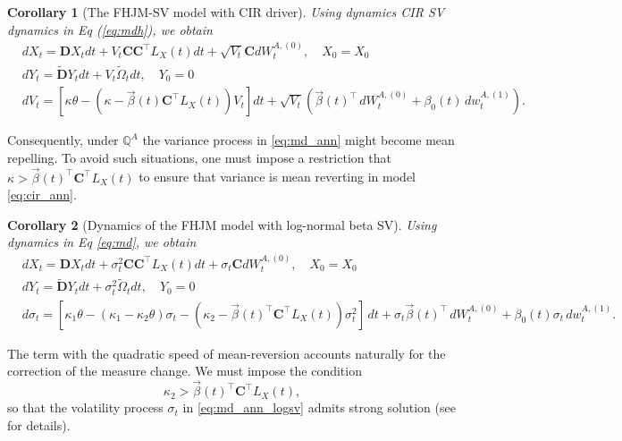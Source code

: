 \documentclass[pdftex,11pt,a4paper] {article}
\newtheorem{corollary}{Corollary}[section]
\begin{document}
\begin{corollary}[The FHJM-SV model with CIR driver] Using dynamics CIR SV dynamics in Eq (\ref{eq:mdh}), we obtain
\begin{equation}\label{eq:cir_ann}
\begin{split}
&   dX_{t} = \mathbf{D} X_{t}dt  +  V_t\mathbf{C}\mathbf{C}^\top L_X(t)dt+\sqrt{V_t}\mathbf{C}dW^{A,(0)}_{t},\quad X_0=X_0 \\
& dY_{t} = \tilde{\mathbf{D}}Y_{t}dt + V_t\tilde\Omega_{t}dt,\quad Y_0=0 \\
&dV_{t}=\left[\kappa\theta-\left(\kappa-\vec\beta(t)\mathbf{C}^\top L_X(t)\right)V_{t}\right]dt + \sqrt{V_{t}} \left(\vec{\beta}(t)^\top\,dW^{A,(0)}_t+\beta_{0}(t)\,dw^{A,(1)}_t\right).
\end{split}
\end{equation}
\end{corollary}
Consequently, under $\mathbb{Q}^A$ the variance process in \eqref{eq:md_ann} might become mean repelling. To avoid such situations, one must impose a restriction that 
$\kappa>\vec{\beta}(t)^\top \mathbf{C}^\top L_X(t)$ to ensure that variance is mean reverting in model \eqref{eq:cir_ann}. 

\begin{corollary}[Dynamics of the FHJM model with log-normal beta SV] Using dynamics in Eq \eqref{eq:md}, we obtain
\begin{equation}\label{eq:md_ann_logsv}
\begin{split}
&   dX_{t} = \mathbf{D} X_{t}dt  +  \sigma_t^2\mathbf{C}\mathbf{C}^\top L_X(t)dt+\sigma_t\mathbf{C}dW^{A,(0)}_{t},\quad X_0=X_0 \\
& dY_{t} = \tilde{\mathbf{D}}Y_{t}dt + \sigma_t^2\tilde\Omega_{t}dt,\quad Y_0=0 \\
&d\sigma_t=\left[\kappa_1\theta-(\kappa_1-\kappa_2\theta)\sigma_t-\left(\kappa_2-\vec{\beta}(t)^\top \mathbf{C}^\top L_X(t)\right)\sigma_t^2\right]\,dt + \sigma_t \vec{\beta}(t)^\top\,dW^{A,(0)}_t+\beta_0(t)\sigma_t\,dw^{A,(1)}_t.
\end{split}
\end{equation}
\end{corollary}
The term with the quadratic speed of mean-reversion accounts naturally for the correction of the measure change. We must impose the condition 
\begin{equation}\label{eq:kappa2_cond_QA}
\kappa_{2}>\vec{\beta}(t)^\top \mathbf{C}^\top L_X(t),
\end{equation} 
so that the volatility process $\sigma_t$ in \eqref{eq:md_ann_logsv} admits strong solution (see \cite{Sepp2024} for details). 
\end{document}
